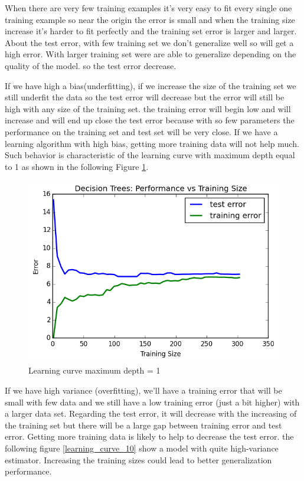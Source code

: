 \documentclass{article}
\begin{document}
When there are very few training examples it's very easy to fit every single one training example so near the origin the error is small and when the training size increase it's harder to fit perfectly and the training set error is larger and larger. About the test error, with few training set we don't generalize well so will get a high error. With larger training set were are able to generalize depending on the quality of the model. so the test error decrease.

If we have high a bias(underfitting), if we increase the size of the training set we still underfit the data so the test error will decrease but the error will still be high with any size of the training set. the training error will begin low and will increase and will end up close the test error because with so few parameters the performance on the training set and test set will be very close. If we have a learning algorithm with high bias, getting more training data will not help much. Such behavior is characteristic of the learning curve with maximum depth equal to 1 as shown in the following Figure \ref{learning_curve_1}.

\begin{figure}[h]
  \begin{center}
	\caption{\label{learning_curve_1} Learning curve maximum depth = 1}
	\includegraphics[width=0.75\columnwidth]{learning_curve_depth_1} %
	\end{center}
\end{figure}


If we have high variance (overfitting), we'll have a training error that  will be small with few data and  we still have a low training error (just a bit higher) with a larger data set. Regarding the test error, it will decrease with the increasing of the training set but there  will be a large gap between training error and test error. Getting more training data is likely to help to decrease the test error. the following figure \ref{learning_curve_10} show a model with quite high-variance estimator. Increasing the training sizes could lead to better generalization performance.
\end{document}
